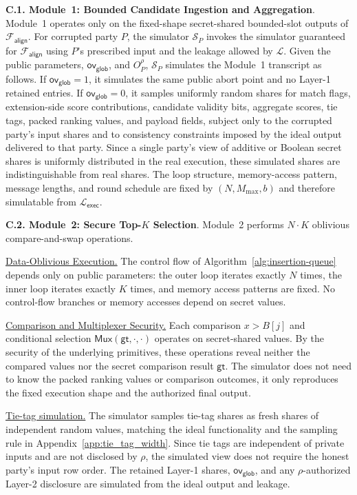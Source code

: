 \documentclass[conference,compsoc,letterpaper]{IEEEtran}
\theoremstyle{definition}
\theoremstyle{remark}
\newcommand{\myparagraph}[1]{\noindent \textbf{#1}.}
\newcommand{\myparagraphunderline}[1]{\noindent \underline{#1.}}
\newcommand{\Leak}{\mathcal{L}}
\newcommand{\LeakExec}{\Leak_{\mathsf{exec}}}
\newcommand{\Sim}{\mathcal{S}}              %
\newcommand{\Falign}{\mathcal{F}_{\mathsf{align}}}
\newcommand{\Mmax}{M_{\max}}
\newcommand{\policy}{\rho}
\newcommand{\scorebits}{b}
\newcommand{\globaloverflow}{\mathsf{ov}_{\mathsf{glob}}}
\begin{document}
\myparagraph{C.1. Module~1: Bounded Candidate Ingestion and Aggregation}
Module~1 operates only on the fixed-shape secret-shared bounded-slot outputs of $\Falign{}$. For corrupted party $P$, the simulator $\Sim_P$ invokes the simulator guaranteed for $\Falign{}$ using $P$'s prescribed input and the leakage allowed by $\Leak$.
Given the public parameters, $\globaloverflow$, and $O_P^\policy$, $\Sim_P$ simulates the Module~1 transcript as follows.
If $\globaloverflow=1$, it simulates the same public abort point and no Layer-1 retained entries.
If $\globaloverflow=0$, it samples uniformly random shares for match flags, extension-side score contributions, candidate validity bits, aggregate scores, tie tags, packed ranking values, and payload fields, subject only to the corrupted party's input shares and to consistency constraints imposed by the ideal output delivered to that party.
Since a single party's view of additive or Boolean secret shares is uniformly distributed in the real execution, these simulated shares are indistinguishable from real shares.
The loop structure, memory-access pattern, message lengths, and round schedule are fixed by $(N,\Mmax,\scorebits)$ and therefore simulatable from $\LeakExec$.

\myparagraph{C.2. Module~2: Secure Top-$K$ Selection}
Module~2 performs $N \cdot K$ oblivious compare-and-swap operations.

\myparagraphunderline{Data-Oblivious Execution}
The control flow of Algorithm~\ref{alg:insertion-queue} depends only on public parameters: the outer loop iterates exactly $N$ times, the inner loop iterates exactly $K$ times, and memory access patterns are fixed.
No control-flow branches or memory accesses depend on secret values.

\myparagraphunderline{Comparison and Multiplexer Security}
Each comparison $x>B[j]$ and conditional selection $\mathsf{Mux}(\mathsf{gt},\cdot,\cdot)$ operates on secret-shared values.
By the security of the underlying primitives, these operations reveal neither the compared values nor the secret comparison result $\mathsf{gt}$.
The simulator does not need to know the packed ranking values or comparison outcomes, it only reproduces the fixed execution shape and the authorized final output.

\myparagraphunderline{Tie-tag simulation}
The simulator samples tie-tag shares as fresh shares of independent random values, matching the ideal functionality and the sampling rule in Appendix~\ref{app:tie_tag_width}.
Since tie tags are independent of private inputs and are not disclosed by $\policy$, the simulated view does not require the honest party's input row order.
The retained Layer-1 shares, $\globaloverflow$, and any $\policy$-authorized Layer-2 disclosure are simulated from the ideal output and leakage.
\end{document}

